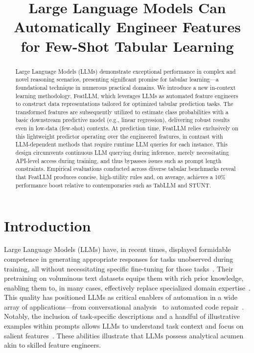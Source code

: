 \title{Large Language Models Can Automatically Engineer Features for Few-Shot Tabular Learning}

\begin{abstract}
Large Language Models (LLMs) demonstrate exceptional performance in complex and novel reasoning scenarios, presenting significant promise for tabular learning—a foundational technique in numerous practical domains. We introduce a new in-context learning methodology, \textsf{FeatLLM}, which leverages LLMs as automated feature engineers to construct data representations tailored for optimized tabular prediction tasks. The transformed features are subsequently utilized to estimate class probabilities with a basic downstream predictive model (e.g., linear regression), delivering robust results even in low-data (few-shot) contexts. At prediction time, \textsf{FeatLLM} relies exclusively on this lightweight predictor operating over the engineered features, in contrast with LLM-dependent methods that require runtime LLM queries for each instance. This design circumvents continuous LLM querying during inference, merely necessitating API-level access during training, and thus bypasses issues such as prompt length constraints. Empirical evaluations conducted across diverse tabular benchmarks reveal that \textsf{FeatLLM} produces concise, high-utility rules and, on average, achieves a 10\% performance boost relative to contemporaries such as TabLLM and STUNT.
\end{abstract}

\section{Introduction}
Large Language Models (LLMs) have, in recent times, displayed formidable competence in generating appropriate responses for tasks unobserved during training, all without necessitating specific fine-tuning for those tasks~\cite{creswell2022selection,imani2023mathprompter,taylor2022galactica}. Their pretraining on voluminous text datasets equips them with rich prior knowledge, enabling them to, in many cases, effectively replace specialized domain expertise~\cite{Genomes2021,singhal2023large,wilcox2003role}. This quality has positioned LLMs as critical enablers of automation in a wide array of applications—from conversational analysis~\cite{finch2023leveraging} to automated code repair~\cite{fan2023automated}. Notably, the inclusion of task-specific descriptions and a handful of illustrative examples within prompts allows LLMs to understand task context and focus on salient features~\cite{brown2020language,zhao2023survey}. These abilities illustrate that LLMs possess analytical acumen akin to skilled feature engineers.

